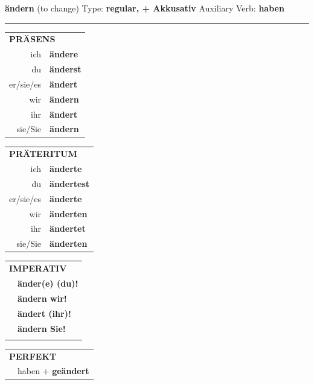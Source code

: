 \documentclass[10pt,a4paper]{revtex4-2}
\begin{document}
\begin{verbbox-acc}
    {\Large \bf ändern} (to change) \hfill Type: \textbf{regular, + Akkusativ} \hfill Auxiliary Verb: \textbf{haben} 
    
     \vspace{5pt}

    \hrule
    
    \vspace{5pt}

  \begin{tabular}{rl}
     \multicolumn{2}{l}{\textbf{PRÄSENS} }\\
    ich & \textbf{ändere}\\
    du & \textbf{änderst}\\
    er/sie/es & \textbf{ändert}\\
    wir & \textbf{ändern}\\
    ihr & \textbf{ändert}\\
    sie/Sie & \textbf{ändern}\\
  \end{tabular}
  \hfill
     \begin{tabular}{rl}
    \multicolumn{2}{l}{\textbf{PRÄTERITUM} }\\
    ich & \textbf{änderte}\\
    du & \textbf{ändertest}\\
    er/sie/es & \textbf{änderte}\\
    wir & \textbf{änderten}\\
    ihr & \textbf{ändertet}\\
    sie/Sie & \textbf{änderten}\\
  \end{tabular}
  \hfill
  \begin{tabular}{rl}
     \multicolumn{2}{l}{\textbf{IMPERATIV} }\\
   & \textbf{änder(e) (du)!}\\
   & \textbf{ändern wir!}\\
   & \textbf{ändert (ihr)!}\\
   & \textbf{ändern Sie!}\\
   & \vspace{10pt}
  \end{tabular}

    \vspace{10pt}

 \begin{tabular}{rl}
     \multicolumn{2}{l}{\textbf{PERFEKT}}\\
  &  haben + \textbf{geändert}\\
  \end{tabular}
\hfill
   \begin{tabular}{rl}
   

\end{tabular}
\end{verbbox-acc}
\end{document}
